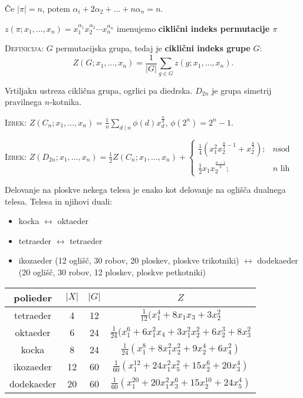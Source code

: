 \documentclass[8pt,a4paper]{amsart}
\theoremstyle{definition} %
\theoremstyle{plain} %
\begin{document}
Če $|\pi| = n$, potem $\alpha_i + 2\alpha_2 + \ldots + n\alpha_n= n$.

$z(\pi ; x_1,\ldots ,x_n)=x_1^{\alpha_1}x_2^{\alpha_2}\cdots x_n^{\alpha_n}$
imenujemo \textbf{ciklični indeks permutacije $\pi$}

\textsc{Definicija:} $G$ permutacijska grupa, tedaj je \textbf{ciklični indeks
grupe} $G$:
$$ Z(G;x_1,\ldots ,x_n) = \frac{1}{|G|} \sum_{g\in G} z(g;x_1,\ldots ,x_n).$$

Vrtiljaku ustreza ciklična grupa, ogrlici pa diedrska. $D_{2n}$ je grupa
simetrij pravilnega $n$-kotnika.

\textsc{Izrek:} $Z(C_n; x_1,\ldots, x_n) = \frac{1}{n} \displaystyle \sum_{d
\mid n} \phi
(d)x_d^{\frac{n}{d}}$, \quad $\phi(2^n) = 2^n-1$.

\textsc{Izrek:} $Z(D_{2n}; x_1,\ldots,x_n) = \frac{1}{2} Z(C_n;x_1,\ldots,x_n) +
\begin{cases} \frac{1}{4}(x_1^2x_2^{\frac{n}{2}-1}+x_2^{\frac{n}{2}});& n \text{
  sod} \\ \frac{1}{2}x_1x_2^{\frac{n-1}{2}};& n \text{ lih} \end{cases}$

Delovanje na ploskve nekega telesa je enako kot delovanje na oglišča dualnega
telesa. Telesa in njihovi duali:
\begin{itemize}
  \item kocka $\leftrightarrow$ oktaeder
  \item tetraeder $\leftrightarrow$ tetraeder
  \item ikozaeder (12 oglišč, 30 robov, 20 ploskev, ploskve trikotniki) $\leftrightarrow$ dodekaeder (20
    oglišč, 30 robov, 12 ploskev, ploskve petkotniki)
\end{itemize}

\begin{tabular}{| c || c | c | c |}\hline
  polieder & $|X|$ & $|G|$ & $Z$ \\ \hline\hline
  tetraeder & 4 & 12 & $\frac{1}{12}(x_1^4+8x_1x_3 + 3x_2^2$\\ \hline
  oktaeder & 6 & 24 & $\frac{1}{24}(x_1^6+6x_1^2x_4 + 3x_1^2x_2^2+6x_2^3+8x_3^2$\\ \hline
  kocka & 8 & 24 & $\frac{1}{24}(x_1^8+8x_1^2x_2^2 + 9x_2^4 + 6x_4^2)$ \\ \hline
  ikozaeder & 12 & 60 & $\frac{1}{60}(x_1^{12} + 24x_1^2x_5^2 + 15x_2^6 + 20x_3^4)$ \\ \hline
  dodekaeder & 20 & 60 & $\frac{1}{60}(x_1^{20} + 20x_1^2x_3^6 + 15x_2^{10} + 24x_5^4)$ \\ \hline
\end{tabular}
\end{document}
